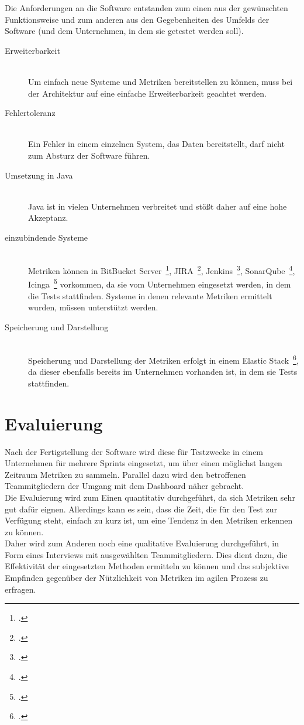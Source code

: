 Die Anforderungen an die Software entstanden zum einen aus der gewünschten Funktionsweise und zum anderen aus den Gegebenheiten des Umfelds der Software (und dem Unternehmen, in dem sie getestet werden soll).

\begin{description}
    \item[Erweiterbarkeit] \hfill \\ Um einfach neue Systeme und Metriken bereitstellen zu können, muss bei der Architektur auf eine einfache Erweiterbarkeit geachtet werden.
    \item[Fehlertoleranz] \hfill \\ Ein Fehler in einem einzelnen System, das Daten bereitstellt, darf nicht zum Absturz der Software führen.
    \item[Umsetzung in Java] \hfill \\ Java ist in vielen Unternehmen verbreitet und stößt daher auf eine hohe Akzeptanz.
    \item[einzubindende Systeme] \hfill \\ Metriken können in BitBucket Server~\footcite{bitbucket_server}, JIRA~\footcite{jira}, Jenkins~\footcite{jenkins}, SonarQube~\footcite{sonarqube}, Icinga~\footcite{icinga} vorkommen, da sie vom Unternehmen eingesetzt werden, in dem die Tests stattfinden. Systeme in denen relevante Metriken ermittelt wurden, müssen unterstützt werden.
    \item[Speicherung und Darstellung] \hfill \\ Speicherung und Darstellung der Metriken erfolgt in einem Elastic Stack~\footcite{elastic_stack}, da dieser ebenfalls bereits im Unternehmen vorhanden ist, in dem sie Tests stattfinden.
\end{description}

\clearpage
\section{Evaluierung}

Nach der Fertigstellung der Software wird diese für Testzwecke in einem Unternehmen für mehrere Sprints eingesetzt, um über einen möglichst langen Zeitraum Metriken zu sammeln.
Parallel dazu wird den betroffenen Teammitgliedern der Umgang mit dem Dashboard näher gebracht.
\\
Die Evaluierung wird zum Einen quantitativ durchgeführt, da sich Metriken sehr gut dafür eignen.
Allerdings kann es sein, dass die Zeit, die für den Test zur Verfügung steht, einfach zu kurz ist, um eine Tendenz in den Metriken erkennen zu können.
\\
Daher wird zum Anderen noch eine qualitative Evaluierung durchgeführt, in Form eines Interviews mit ausgewählten Teammitgliedern.
Dies dient dazu, die Effektivität der eingesetzten Methoden ermitteln zu können und das subjektive Empfinden gegenüber der Nützlichkeit von Metriken im agilen Prozess zu erfragen.
